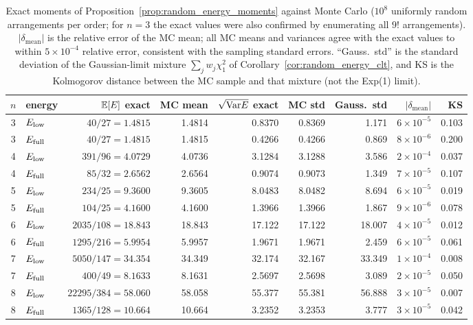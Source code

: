 \begin{table}[htbp]
\centering
\small
\begin{tabular}{c l r r r r r r r}
\toprule
$n$ & energy & $\mathbb{E}[E]$ exact & MC mean & $\sqrt{\mathrm{Var} E}$ exact & MC std & Gauss.\ std & $|\delta_{\mathrm{mean}}|$ & KS \\
\midrule
3 & $E_{\mathrm{low}}$  & $40/27=1.4815$ & 1.4814 & 0.8370 & 0.8369 & 1.171 & $6\times10^{-5}$ & 0.103 \\
3 & $E_{\mathrm{full}}$ & $40/27=1.4815$ & 1.4815 & 0.4266 & 0.4266 & 0.869 & $8\times10^{-6}$ & 0.200 \\
4 & $E_{\mathrm{low}}$  & $391/96=4.0729$ & 4.0736 & 3.1284 & 3.1288 & 3.586 & $2\times10^{-4}$ & 0.037 \\
4 & $E_{\mathrm{full}}$ & $85/32=2.6562$ & 2.6564 & 0.9074 & 0.9073 & 1.349 & $7\times10^{-5}$ & 0.107 \\
5 & $E_{\mathrm{low}}$  & $234/25=9.3600$ & 9.3605 & 8.0483 & 8.0482 & 8.694 & $6\times10^{-5}$ & 0.019 \\
5 & $E_{\mathrm{full}}$ & $104/25=4.1600$ & 4.1600 & 1.3966 & 1.3966 & 1.867 & $9\times10^{-6}$ & 0.078 \\
6 & $E_{\mathrm{low}}$  & $2035/108=18.843$ & 18.843 & 17.122 & 17.122 & 18.007 & $4\times10^{-5}$ & 0.012 \\
6 & $E_{\mathrm{full}}$ & $1295/216=5.9954$ & 5.9957 & 1.9671 & 1.9671 & 2.459 & $6\times10^{-5}$ & 0.061 \\
7 & $E_{\mathrm{low}}$  & $5050/147=34.354$ & 34.349 & 32.174 & 32.167 & 33.349 & $1\times10^{-4}$ & 0.008 \\
7 & $E_{\mathrm{full}}$ & $400/49=8.1633$ & 8.1631 & 2.5697 & 2.5698 & 3.089 & $2\times10^{-5}$ & 0.050 \\
8 & $E_{\mathrm{low}}$  & $22295/384=58.060$ & 58.058 & 55.377 & 55.381 & 56.888 & $3\times10^{-5}$ & 0.007 \\
8 & $E_{\mathrm{full}}$ & $1365/128=10.664$ & 10.664 & 3.2352 & 3.2353 & 3.777 & $3\times10^{-5}$ & 0.042 \\
\bottomrule
\end{tabular}
\caption{Exact moments of Proposition~\ref{prop:random_energy_moments} against Monte Carlo
($10^8$ uniformly random arrangements per order; for $n=3$ the exact values were also confirmed by
enumerating all $9!$ arrangements). $|\delta_{\mathrm{mean}}|$ is the relative error of the MC mean;
all MC means and variances agree with the exact values to within $5\times10^{-4}$ relative error,
consistent with the sampling standard errors. ``Gauss.\ std'' is the standard deviation
of the Gaussian-limit mixture $\sum_j w_j\chi^2_1$ of Corollary~\ref{cor:random_energy_clt}, and KS
is the Kolmogorov distance between the MC sample and that mixture (not the Exp(1) limit).}
\label{tab:random_energy}
\end{table}

